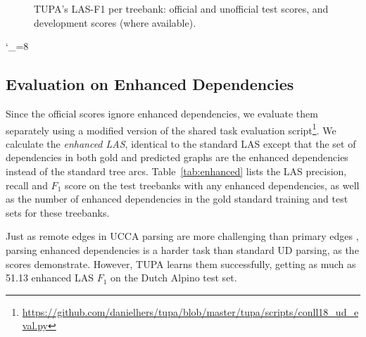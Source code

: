 \documentclass[11pt,a4paper]{article}
\begin{document}
\begin{figure*}[h]
    \caption{TUPA's LAS-F1 per treebank: official and unofficial test scores, and development scores (where available).
    \label{fig:test_per_corpus}}
\end{figure*}
\catcode`\_=8


\subsection{Evaluation on Enhanced Dependencies}\label{sec:enhanced_results}

Since the official scores ignore enhanced dependencies,
we evaluate them separately using a modified version of the shared task evaluation
script\footnote{\url{https://github.com/danielhers/tupa/blob/master/tupa/scripts/conll18_ud_eval.py}}.
We calculate the \textit{enhanced LAS},
identical to the standard LAS except that the set of dependencies
in both gold and predicted graphs are the enhanced dependencies instead
of the standard tree arcs.
Table~\ref{tab:enhanced} lists the LAS precision, recall and $F_1$ score
on the test treebanks with any enhanced dependencies,
as well as the number of enhanced dependencies in the gold standard
training and test sets for these treebanks.

Just as remote edges in UCCA parsing are more challenging
than primary edges \cite{hershcovich2017a},
parsing enhanced dependencies is a harder task than standard UD parsing,
as the scores demonstrate.
However, TUPA learns them successfully, getting as much as 51.13 enhanced LAS $F_1$
on the Dutch Alpino test set.
\end{document}
